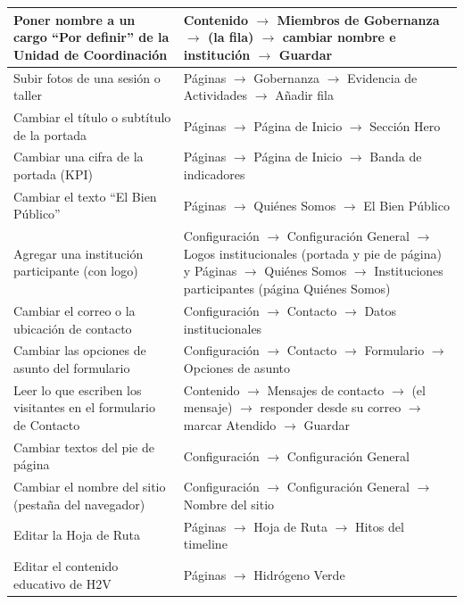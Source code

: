 \documentclass[11pt,letterpaper]{report}
\begin{document}
\begin{longtable}{>{\raggedright\arraybackslash}p{}>{\raggedright\arraybackslash}p{}}
Poner nombre a un cargo “Por definir” de la Unidad de Coordinación & Contenido $\rightarrow$ Miembros de Gobernanza $\rightarrow$ (la fila) $\rightarrow$ cambiar nombre e institución $\rightarrow$ Guardar \\ \midrule
\rowcolor{filaalt}Subir fotos de una sesión o taller & Páginas $\rightarrow$ Gobernanza $\rightarrow$ Evidencia de Actividades $\rightarrow$ Añadir fila \\ \midrule
Cambiar el título o subtítulo de la portada & Páginas $\rightarrow$ Página de Inicio $\rightarrow$ Sección Hero \\ \midrule
\rowcolor{filaalt}Cambiar una cifra de la portada (KPI) & Páginas $\rightarrow$ Página de Inicio $\rightarrow$ Banda de indicadores \\ \midrule
Cambiar el texto “El Bien Público” & Páginas $\rightarrow$ Quiénes Somos $\rightarrow$ El Bien Público \\ \midrule
\rowcolor{filaalt}Agregar una institución participante (con logo) & Configuración $\rightarrow$ Configuración General $\rightarrow$ Logos institucionales (portada y pie de página) y Páginas $\rightarrow$ Quiénes Somos $\rightarrow$ Instituciones participantes (página Quiénes Somos) \\ \midrule
Cambiar el correo o la ubicación de contacto & Configuración $\rightarrow$ Contacto $\rightarrow$ Datos institucionales \\ \midrule
\rowcolor{filaalt}Cambiar las opciones de asunto del formulario & Configuración $\rightarrow$ Contacto $\rightarrow$ Formulario $\rightarrow$ Opciones de asunto \\ \midrule
Leer lo que escriben los visitantes en el formulario de Contacto & Contenido $\rightarrow$ Mensajes de contacto $\rightarrow$ (el mensaje) $\rightarrow$ responder desde su correo $\rightarrow$ marcar Atendido $\rightarrow$ Guardar \\ \midrule
\rowcolor{filaalt}Cambiar textos del pie de página & Configuración $\rightarrow$ Configuración General \\ \midrule
Cambiar el nombre del sitio (pestaña del navegador) & Configuración $\rightarrow$ Configuración General $\rightarrow$ Nombre del sitio \\ \midrule
\rowcolor{filaalt}Editar la Hoja de Ruta & Páginas $\rightarrow$ Hoja de Ruta $\rightarrow$ Hitos del timeline \\ \midrule
Editar el contenido educativo de H2V & Páginas $\rightarrow$ Hidrógeno Verde \\ \midrule

\end{longtable}
\end{document}
